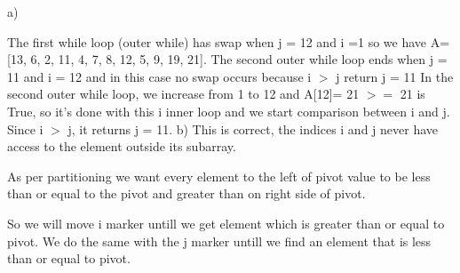 \documentclass[addpoints,11pt]{exam}
\begin{document}
\begin{questions}

\begin{solutionorbox}
a) \newline

The first while loop (outer while) has swap when j = 12 and i =1
so we have A= [13, 6, 2, 11, 4, 7, 8, 12, 5, 9, 19, 21]. \newline
The second outer while loop ends when j = 11 and i = 12
and in this case no swap occurs because i $>$ j return j = 11
In the second outer while loop, we increase from 1 to 12 and A[12]= 21 $>=$ 21 is True, so it's done with this i inner loop and we start comparison between i and j. Since i $>$ j, it returns j = 11. \newline
b) \newline
This is correct, the indices i and j never have access to the element outside its subarray. 

As per partitioning we want every element to the left of pivot value to be less than or equal to the pivot and greater than on right side of pivot.

So we will move i marker untill we get element which is greater than or equal to pivot. We do the same with the j marker untill we find an element that is less than or equal to pivot.


\end{solutionorbox}
\end{questions}
\end{document}
